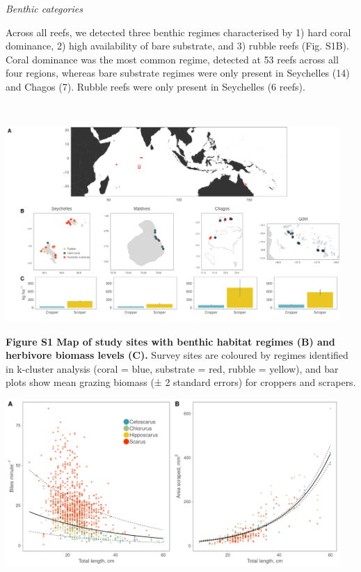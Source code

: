 \documentclass[12pt,]{article}
\begin{document}
\emph{Benthic categories}

Across all reefs, we detected three benthic regimes characterised by 1)
hard coral dominance, 2) high availability of bare substrate, and 3)
rubble reefs (Fig. S1B). Coral dominance was the most common regime,
detected at 53 reefs across all four regions, whereas bare substrate
regimes were only present in Seychelles (14) and Chagos (7). Rubble
reefs were only present in Seychelles (6 reefs).

~

\begin{center}\includegraphics[width=480px]{../../figures/Figure1} \end{center}

\textbf{Figure S1 \textbar{} Map of study sites with benthic habitat
regimes (B) and herbivore biomass levels (C).} Survey sites are coloured
by regimes identified in k-cluster analysis (coral = blue, substrate =
red, rubble = yellow), and bar plots show mean grazing biomass (± 2
standard errors) for croppers and scrapers.

\newpage

\begin{center}\includegraphics[width=480px]{../../figures/FigureS1_scrape_size} \end{center}
\end{document}
